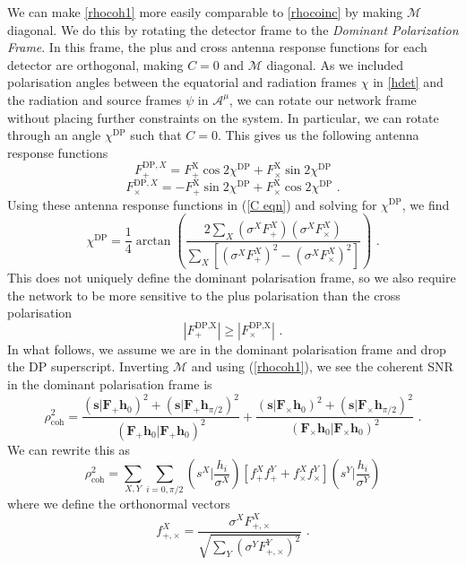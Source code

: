 \documentclass[11pt]{cuthesis}
\newcommand{\fs}{\text{ .}}
\begin{document}
We can make \ref{rhocoh1} more easily comparable to \ref{rhocoinc} by making $\mathcal{M}$ diagonal. We do this by rotating the detector frame to the \textit{Dominant Polarization Frame}. In this frame, the plus and cross antenna response functions for each detector are orthogonal, making $C=0$ and $\mathcal{M}$ diagonal. As we included polarisation angles between the equatorial and radiation frames $\chi$ in \ref{hdet} and the radiation and source frames $\psi$ in $\mathcal{A}^\mu$, we can rotate our network frame without placing further constraints on the system. In particular, we can rotate through an angle $\chi^\text{DP}$ such that $C=0$. This gives us the following antenna response functions 
\begin{equation}
F_+^{\text{DP},X} = F_+^\text{X} \cos 2\chi^\text{DP} + F^\text{X}_\times \sin 2\chi^\text{DP}
\end{equation}
\begin{equation}
F_\times^{\text{DP},X} = -F_+^\text{X} \sin 2\chi^\text{DP} + F^\text{X}_\times \cos 2\chi^\text{DP} \fs
\end{equation}
Using these antenna response functions in (\ref{C eqn}) and solving for $\chi^\text{DP}$, we find
\begin{equation}
\chi^\text{DP} = \frac{1}{4} \arctan \left( \frac{2\sum_X (\sigma^X F^X_+)(\sigma^X F^X_\times)}{\sum_X \left[ (\sigma^X F^X_+)^2 - (\sigma^X F^X_\times)^2 \right] }  \right) \fs
\end{equation}
This does not uniquely define the dominant polarisation frame, so we also require the network to be more sensitive to the plus polarisation than the cross polarisation
\begin{equation}
|F^\text{DP,X}_+ | \geq | F^\text{DP,X}_\times | \fs
\end{equation}
In what follows, we assume we are in the dominant polarisation frame and drop the DP superscript. Inverting $\mathcal{M}$ and using (\ref{rhocoh1}), we see the coherent SNR in the dominant polarisation frame is
\begin{equation} \label{rhocoh dof}
\rho_\text{coh}^2 = \frac{(\textbf{s}|\textbf{F}_+ \textbf{h}_0)^2 + (\textbf{s}|\textbf{F}_+ \textbf{h}_{\pi/2})^2}{(\textbf{F}_+\textbf{h}_0|\textbf{F}_+\textbf{h}_0)^2} + \frac{(\textbf{s}|\textbf{F}_\times \textbf{h}_0)^2 + (\textbf{s}|\textbf{F}_\times \textbf{h}_{\pi/2})^2}{(\textbf{F}_\times\textbf{h}_0|\textbf{F}_\times\textbf{h}_0)^2} \fs
\end{equation}
We can rewrite this as
\begin{equation} \label{rhocoh}
\rho_\text{coh}^2 = \sum_{X,Y} \sum_{i=0,\pi/2} \left( s^X \bigg| \frac{h_i}{\sigma^X} \right) [f_+^X f_+^Y + f_\times^X f_\times^Y]  \left( s^Y \bigg| \frac{h_i}{\sigma^Y} \right)
\end{equation}
where we define the orthonormal vectors
\begin{equation}
f^X_{+,\times} = \frac{\sigma^X F^X_{+,\times}}{\sqrt{\sum_Y( \sigma^Y F^Y_{+,\times})^2}} \textbf{ .}
\end{equation}
\end{document}

